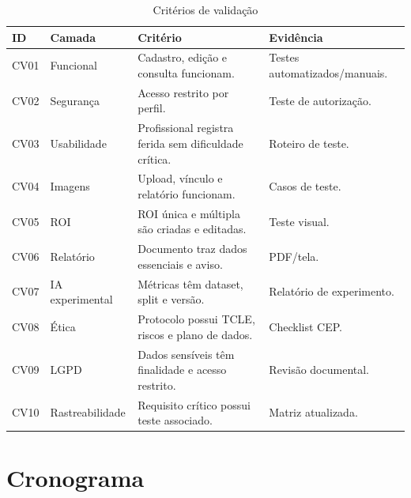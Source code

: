 \documentclass[
    12pt,
    oneside,
    a4paper,
    chapter=TITLE,
    brazil,
    sumario=tradicional,
    hidelinks
]{abntex2}
\begin{document}
\begin{table}[htbp]
    \centering
    \caption{\label{tab:validacao}Critérios de validação}
    \begin{tabular}{L{1.4cm}L{3.0cm}L{5.5cm}L{3.2cm}}
        \toprule
        \textbf{ID} & \textbf{Camada} & \textbf{Critério} & \textbf{Evidência} \\
        \midrule
        CV01 & Funcional & Cadastro, edição e consulta funcionam. & Testes automatizados/manuais. \\
        CV02 & Segurança & Acesso restrito por perfil. & Teste de autorização. \\
        CV03 & Usabilidade & Profissional registra ferida sem dificuldade crítica. & Roteiro de teste. \\
        CV04 & Imagens & Upload, vínculo e relatório funcionam. & Casos de teste. \\
        CV05 & ROI & ROI única e múltipla são criadas e editadas. & Teste visual. \\
        CV06 & Relatório & Documento traz dados essenciais e aviso. & PDF/tela. \\
        CV07 & IA experimental & Métricas têm dataset, split e versão. & Relatório de experimento. \\
        CV08 & Ética & Protocolo possui TCLE, riscos e plano de dados. & Checklist CEP. \\
        CV09 & LGPD & Dados sensíveis têm finalidade e acesso restrito. & Revisão documental. \\
        CV10 & Rastreabilidade & Requisito crítico possui teste associado. & Matriz atualizada. \\
        \bottomrule
    \end{tabular}
\end{table}

\chapter{Cronograma}
\end{document}
